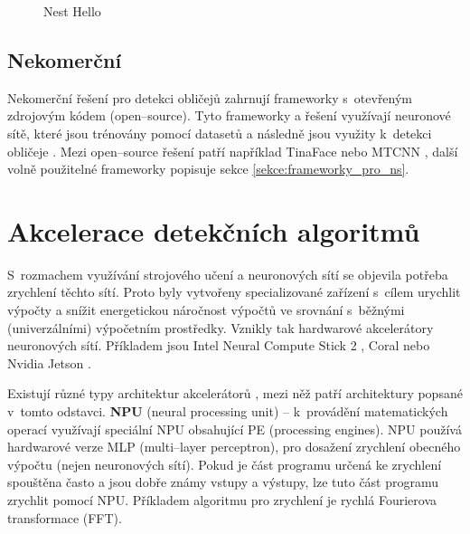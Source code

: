 \begin{figure}[H]
  \begin{center}
  \label{nest}
  \caption{Nest Hello \cite{securityCamsWeb2}}
  \end{center}
\end{figure}

\subsection*{Nekomerční}
Nekomerční řešení pro detekci obličejů zahrnují frameworky s~otevřeným zdrojovým
kódem (open--source). Tyto frameworky a řešení využívají neuronové sítě, které jsou trénovány
pomocí datasetů a následně jsou využity k~detekci obličeje 
\cite{faceRecognitionFrameworks}.
Mezi open--source řešení patří například TinaFace \cite{TinaFace} nebo MTCNN \cite{MTCNN}, další volně použitelné frameworky popisuje sekce \ref{sekce:frameworky_pro_ns}.


\section{Akcelerace detekčních algoritmů}
\label{sekce:akcelerace}

S~rozmachem využívání strojového učení a neuronových sítí se objevila potřeba zrychlení těchto sítí. Proto byly vytvořeny specializované zařízení s~cílem urychlit výpočty a snížit energetickou náročnost výpočtů ve srovnání s~běžnými (univerzálními) výpočetním prostředky. Vznikly tak hardwarové akcelerátory neuronových sítí. Příkladem jsou Intel Neural Compute Stick 2 \cite{ncs2}, Coral \cite{coral} nebo Nvidia Jetson \cite{jetson}.

Existují různé typy architektur akcelerátorů \cite{acceleratorsSurvey}, mezi něž patří architektury popsané v~tomto odstavci.
\textbf{NPU} (neural processing unit) -- k~provádění matematických operací využívají speciální NPU obsahující PE (processing engines). NPU používá hardwarové verze MLP (multi--layer perceptron), pro dosažení zrychlení obecného výpočtu (nejen neuronových sítí). Pokud je část programu určená ke zrychlení spouštěna často a jsou dobře známy vstupy a výstupy, lze tuto část programu zrychlit pomocí NPU. Příkladem algoritmu pro zrychlení je rychlá Fourierova transformace (FFT).

